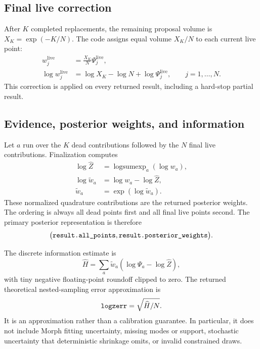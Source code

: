 \documentclass[11pt,a4paper]{article}
\newcommand{\code}[1]{\texttt{\detokenize{#1}}}
\begin{document}
\subsection{Final live correction}

After \(K\) completed replacements, the remaining proposal volume is
\(X_K=\exp(-K/N)\).  The code assigns equal volume \(X_K/N\) to each current
live point:
\begin{align}
  w_j^{\mathrm{live}}
    &= \frac{X_K}{N}\Psi_j^{\mathrm{live}},\\
  \log w_j^{\mathrm{live}}
    &= \log X_K-\log N+\log\Psi_j^{\mathrm{live}},
    \qquad j=1,\ldots,N.
  \label{eq:live-weight}
\end{align}
This correction is applied on every returned result, including a hard-stop
partial result.

\subsection{Evidence, posterior weights, and information}

Let \(a\) run over the \(K\) dead contributions followed by the \(N\) final
live contributions.  Finalization computes
\begin{align}
  \log\widehat Z
    &= \operatorname{logsumexp}_a(\log w_a),\\
  \log\widetilde w_a
    &= \log w_a-\log\widehat Z,\\
  \widetilde w_a
    &= \exp(\log\widetilde w_a).
  \label{eq:posterior-weights}
\end{align}
These normalized quadrature contributions are the returned posterior weights.
The ordering is always all dead points first and all final live points second.
The primary posterior representation is therefore
\[
  \bigl(\code{result.all_points},
        \code{result.posterior_weights}\bigr).
\]

The discrete information estimate is
\begin{equation}
  \widehat H
  = \sum_a \widetilde w_a
      \left(\log\Psi_a-\log\widehat Z\right),
  \label{eq:information}
\end{equation}
with tiny negative floating-point roundoff clipped to zero.  The returned
theoretical nested-sampling error approximation is
\begin{equation}
  \code{logzerr}
  = \sqrt{\widehat H/N}.
  \label{eq:logzerr}
\end{equation}
It is an approximation rather than a calibration guarantee.  In particular,
it does not include Morph fitting uncertainty, missing modes or support,
stochastic uncertainty that deterministic shrinkage omits, or invalid
constrained draws.
\end{document}
